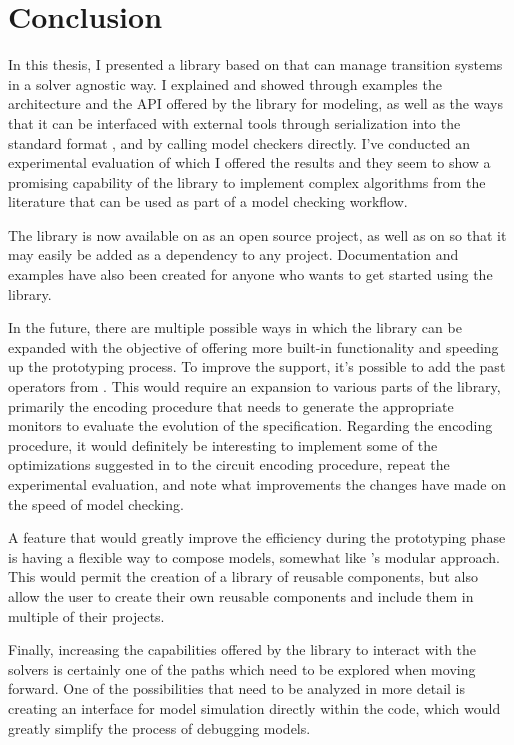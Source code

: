 \chapter{Conclusion}
\label{ch:conclusions}

In this thesis, I presented \pyvmt{} a \python{} library based on \pysmt{} that can manage transition systems in a solver agnostic way.
I explained and showed through examples the architecture and the API offered by the library for modeling, as well as the ways that it can be interfaced with external tools through serialization into the standard format \vmtlib{}, and by calling model checkers directly.
I've conducted an experimental evaluation of which I offered the results and they seem to show a promising capability of the library to implement complex algorithms from the literature that can be used as part of a model checking workflow.

The library is now available on \github{} \cite{pyvmt-github} as an open source project, as well as on \pypi{} so that it may easily be added as a dependency to any project.
Documentation and examples have also been created for anyone who wants to get started using the library.

In the future, there are multiple possible ways in which the library can be expanded with the objective of offering more built-in functionality and speeding up the prototyping process.
To improve the \ltl{} support, it's possible to add the past operators from \pltl{}.
This would require an expansion to various parts of the library, primarily the encoding procedure that needs to generate the appropriate monitors to evaluate the evolution of the specification.
Regarding the \ltl{} encoding procedure, it would definitely be interesting to implement some of the optimizations suggested in \cite{DBLP:conf/fmcad/ClaessenES13} to the \ltl{} circuit encoding procedure, repeat the experimental evaluation, and note what improvements the changes have made on the speed of model checking.

A feature that would greatly improve the efficiency during the prototyping phase is having a flexible way to compose models, somewhat like \nuxmv{}'s modular approach.
This would permit the creation of a library of reusable components, but also allow the user to create their own reusable components and include them in multiple of their projects.

Finally, increasing the capabilities offered by the library to interact with the solvers is certainly one of the paths which need to be explored when moving forward.
One of the possibilities that need to be analyzed in more detail is creating an interface for model simulation directly within the \python{} code, which would greatly simplify the process of debugging models.
